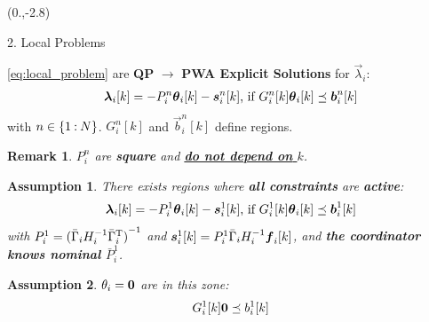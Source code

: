 \documentclass[presentation]{beamer}
\newtheorem{assumption}{Assumption}%
\newtheorem{remark}{Remark}%
\begin{document}
\begin{frame}
\def\secrow{-2.8}
  \begin{textblock}{5.1}(0.,\secrow)
    \begin{block}{2. Local Problems}
      \begin{center}
          \centering
        \begin{minipage}[c]{.95\textwidth}
      \eqref{eq:local_problem} are {\bf QP}  $\to$ {\bf PWA Explicit Solutions} for $\vec{\lambda}_{i}$:
        \begin{equation}
          \centering
            \begin{aligned}\label{eq:lambdafuntheta}
              \lambdaik=
              -P_{i}^{n}\thetaik-\vec{s}_{i}^{n}[k]\text{, if}\ G_{i}^{n}[k]\thetaik \preceq \vec{b}_{i}^{n}[k]
            \end{aligned}
          \end{equation}
        with $n\in\{1\mathbin{:} N\}$. $G_{i}^{n}[k]$ and $\vec{b}_{i}^{n}[k]$ define regions.
        \begin{remark}\label{rmk:p_constant}
        {\color{ietr_brightblue} $P^{n}_{i}$ are \textbf{square} and \underline{\textbf{do not depend on} $k$}.}
        \end{remark}
        \vspace{1.cm}
      \begin{assumption}
        There exists regions where \textbf{all constraints} are \textbf{active}:
          \begin{equation}
            \vec{\lambda}_{i}[k]=-P_{i}^{1}\thetaik-\vec{s}_{i}^{1}[k]\text{, if}\ G_{i}^{1}[k]\thetaik \preceq \vec{b}_{i}^{1}[k]
          \end{equation}
          with ${P_{i}^{1}={(\bar{\Gamma}_{i}H_{i}^{-1}\bar{\Gamma}_{i}^{\mathrm{T}})}^{-1}}$ and ${\vec{s}_{i}^{1}[k]=P_{i}^{1}\bar{\Gamma}_{i}H_{i}^{-1}\fik}$, and
          \textbf{the coordinator knows nominal $\bar{P}_{i}^{1}$}.
      \end{assumption}
        \vspace{1.cm}
      \begin{assumption}
        $\theta_{i}=\mathbf{0}$ are in this zone:
          \begin{equation}
            G_{i}^{1}[k]\mathbf{0} \preceq b_{i}^{1}[k]
          \end{equation}
      \end{assumption}
      \vspace{-2cm}
      \end{minipage}
      \end{center}
    \end{block}
  \end{textblock}


\end{frame}
\end{document}
